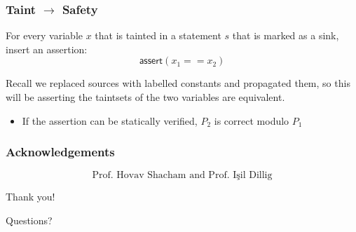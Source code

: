 \documentclass{beamer} %
\theoremstyle{definition} %
\begin{document}
\begin{frame}
\frametitle{Taint $\to$ Safety}
	
	For every variable $x$ that is tainted in a statement $s$ that is marked as a sink, insert an assertion: \[\textsf{assert}(x_1 == x_2)\]

    Recall we replaced sources with labelled constants and propagated them, so this will be asserting the taintsets of the two variables are equivalent.
    
    \pause

    \begin{itemize}
        \item If the assertion can be statically verified, $P_2$ is correct modulo $P_1$
    \end{itemize}
	

\end{frame}

\begin{frame}
\frametitle{Acknowledgements}
	\[\text{Prof. Hovav Shacham and Prof. Işil Dillig}\]
\end{frame}

\begin{frame}
    \begin{center}
    Thank you! 
    
    \LARGE{Questions?}
    \end{center}
\end{frame}








\end{document}

